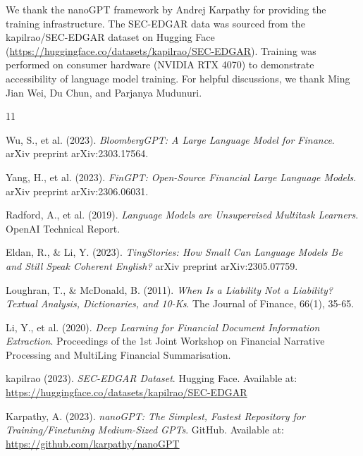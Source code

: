 \documentclass[12pt]{article}
\begin{document}
We thank the nanoGPT framework by Andrej Karpathy for providing the training infrastructure. The SEC-EDGAR data was sourced from the kapilrao/SEC-EDGAR dataset on Hugging Face (\url{https://huggingface.co/datasets/kapilrao/SEC-EDGAR}). Training was performed on consumer hardware (NVIDIA RTX 4070) to demonstrate accessibility of language model training. For helpful discussions, we thank Ming Jian Wei, Du Chun, and Parjanya Mudunuri.

\begin{thebibliography}{11}

Wu, S., et al. (2023).
\textit{BloombergGPT: A Large Language Model for Finance}.
arXiv preprint arXiv:2303.17564.

Yang, H., et al. (2023).
\textit{FinGPT: Open-Source Financial Large Language Models}.
arXiv preprint arXiv:2306.06031.

Radford, A., et al. (2019).
\textit{Language Models are Unsupervised Multitask Learners}.
OpenAI Technical Report.

Eldan, R., \& Li, Y. (2023).
\textit{TinyStories: How Small Can Language Models Be and Still Speak Coherent English?}
arXiv preprint arXiv:2305.07759.

Loughran, T., \& McDonald, B. (2011).
\textit{When Is a Liability Not a Liability? Textual Analysis, Dictionaries, and 10-Ks}.
The Journal of Finance, 66(1), 35-65.

Li, Y., et al. (2020).
\textit{Deep Learning for Financial Document Information Extraction}.
Proceedings of the 1st Joint Workshop on Financial Narrative Processing and MultiLing Financial Summarisation.

kapilrao (2023).
\textit{SEC-EDGAR Dataset}.
Hugging Face. Available at: \url{https://huggingface.co/datasets/kapilrao/SEC-EDGAR}

Karpathy, A. (2023).
\textit{nanoGPT: The Simplest, Fastest Repository for Training/Finetuning Medium-Sized GPTs}.
GitHub. Available at: \url{https://github.com/karpathy/nanoGPT}

\end{thebibliography}
\end{document}
